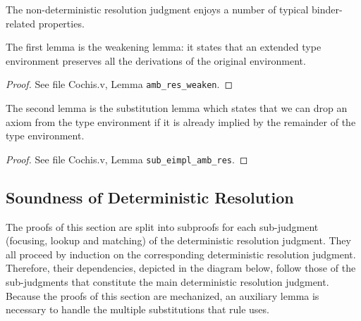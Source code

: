 The non-deterministic resolution judgment enjoys a number of
typical binder-related properties.

The first lemma is the weakening lemma: it states that an extended type environment
preserves all the derivations of the original environment.

{\centering
{}}
\begin{proof}
See file Cochis.v, Lemma \texttt{amb\_res\_weaken}.
\end{proof}
The second lemma is the substitution lemma which states that
we can drop an axiom from the type environment if it is already implied
by the remainder of the type environment.

{\centering
{}}
\begin{proof}
	See file Cochis.v, Lemma \texttt{sub\_eimpl\_amb\_res}.
\end{proof}

\subsection{Soundness of Deterministic Resolution}
\label{proof:det_soundness}
The proofs of this section are split into subproofs for each sub-judgment (focusing, lookup
and matching) of the deterministic resolution judgment. They all proceed by induction on
the corresponding deterministic resolution judgment. Therefore, their dependencies, depicted in
the diagram below, follow those of the sub-judgments that constitute the main deterministic
resolution judgment. Because the proofs of this section are mechanized, an auxiliary lemma
is necessary to handle the multiple substitutions that rule  uses.

